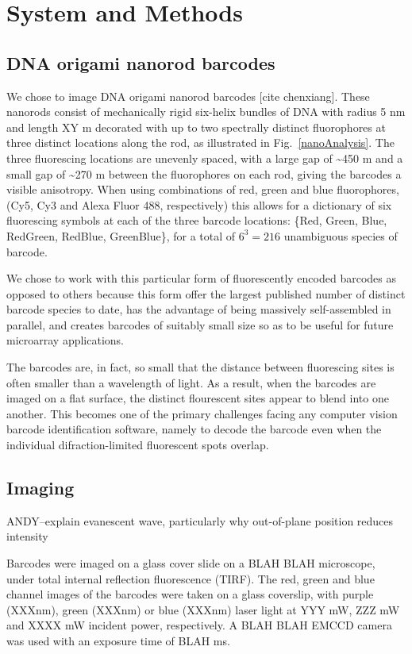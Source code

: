\section{System and Methods}

\subsection{DNA origami nanorod barcodes}
We chose to image DNA origami nanorod barcodes [cite chenxiang]. These nanorods consist of mechanically rigid six-helix bundles of DNA with radius 5 nm and length XY \textmu m decorated with  up to two spectrally distinct fluorophores at three distinct locations along the rod, as illustrated in Fig.~\ref{nanoAnalysis}. The three fluorescing locations are unevenly spaced, with a large gap of \textasciitilde 450 \textmu m and a small gap of \textasciitilde 270 \textmu m  between the fluorophores on each rod, giving the barcodes a visible anisotropy. When using combinations of red, green and blue fluorophores, (Cy5, Cy3 and Alexa Fluor 488, respectively) this allows for a dictionary of six fluorescing symbols at each of the three barcode locations: \{Red, Green, Blue, RedGreen, RedBlue, GreenBlue\}, for a total of $6^{3}=216$  unambiguous species of barcode.

We chose to work with this particular form of fluorescently encoded barcodes as opposed to others because this form offer the largest published number of distinct barcode species to date, has the advantage of being massively self-assembled in parallel, and creates barcodes of suitably small  size so as to be useful for future microarray applications. 

The barcodes are, in fact, so small that the distance between fluorescing sites is often smaller than a wavelength of light. As a result, when the barcodes are imaged on a flat surface, the distinct flourescent sites appear to blend into one another. This becomes one of the primary challenges facing any computer vision barcode identification software, namely to  decode the barcode even when the individual difraction-limited fluorescent spots overlap. 

\subsection{Imaging}
ANDY--explain evanescent wave, particularly why out-of-plane position reduces intensity

Barcodes were imaged on a glass cover slide on a BLAH BLAH microscope,  under total internal reflection fluorescence (TIRF). 
The red, green and blue channel images of the barcodes were taken on a glass coverslip, with purple (XXXnm), green (XXXnm) or blue (XXXnm) laser light at YYY mW, ZZZ mW and XXXX mW incident power, respectively. A BLAH BLAH EMCCD camera was used with an exposure time of BLAH ms.
 
